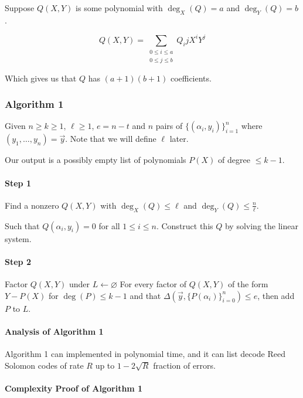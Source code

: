 \documentclass{idc_msc}
\begin{document}
Suppose \(Q(X,Y)\) is some polynomial with \(\deg_X(Q) = a\) and \(\deg_Y(Q) = b\).

\[Q(X,Y) = \sum_{\begin{matrix}0 \le i \le a \\ 0 \le j \le b\end{matrix}} Q_ij X^i Y^j\]

Which gives us that \(Q\) has \((a+1)(b+1)\) coefficients.

\subsubsection{Algorithm 1}

Given \(n \ge k \ge 1\), \(\ell \ge 1\), \(e = n - t\) and \(n\) pairs of \(\{(\alpha_i, y_i)\}^n_{i=1}\) where \((y_1,\ldots,y_n) = \vec{y}\).
Note that we will define \(\ell\) later.

Our output is a possibly empty list of polynomials \(P(X)\) of degree \(\le k - 1\).

\paragraph{Step 1}

Find a nonzero \(Q(X,Y)\) with \(\deg_X(Q) \le \ell\) and \(\deg_Y(Q) \le \frac{n}{\ell}\).

Such that \(Q(\alpha_i, y_i) = 0\) for all \(1 \le i \le n\).
Construct this \(Q\) by solving the linear system.

\paragraph{Step 2}

Factor \(Q(X,Y)\) under \(L \gets \varnothing\)
For every factor of \(Q(X,Y)\) of the form \(Y - P(X)\) for \(\deg(P) \le k - 1\) and that \(\Delta(\vec{y}, \{P(\alpha_i)\}^n_{i=0}) \le e\), then add \(P\) to \(L\).

\paragraph{Analysis of Algorithm 1}

Algorithm 1 can implemented in polynomial time, and it can list decode Reed Solomon codes of rate \(R\) up to \(1 - 2\sqrt{R}\) fraction of errors.


\paragraph{Complexity Proof of Algorithm 1}
\end{document}
